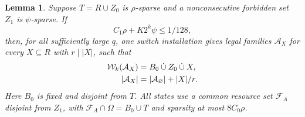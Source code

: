 \documentclass[12pt,letterpaper,onecolumn]{article}
\newtheorem{lemma}[theorem]{Lemma}
\theoremstyle{definition}
\newcommand{\cF}{\mathcal F}
\newcommand{\cA}{\mathcal A}
\newcommand{\cW}{\mathcal W}
\begin{document}
\begin{lemma}\label{lem:absorber}
Suppose $T=R\cup Z_0$ is $\rho$-sparse and a nonconsecutive forbidden set $Z_1$ is $\psi$-sparse. If
\begin{equation}
 C_1\rho+K2^k\psi\le1/128,
 \label{eq:small-load}
\end{equation}
then, for all sufficiently large $q$, one switch installation gives legal families $\cA_X$ for every $X\subseteq R$ with $r\mid|X|$, such that
\begin{align}
 \cW_k(\cA_X)&=B_0\mathbin{\dot\cup}Z_0\mathbin{\dot\cup}X,\notag\\
 |\cA_X|&=|\cA_\varnothing|+|X|/r.
 \label{eq:absorption}
\end{align}
Here $B_0$ is fixed and disjoint from $T$. All states use a common resource set $\cF_A$ disjoint from $Z_1$, with $\cF_A\cap\Omega=B_0\cup T$ and sparsity at most $8C_0\rho$.
\end{lemma}
\end{document}
